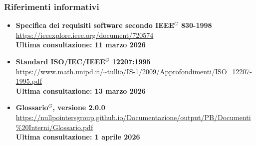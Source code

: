 	\subsubsection{Riferimenti informativi}
	\begin{itemize}[itemsep=5pt, parsep=5pt, label=$\scriptstyle\bullet$]

    \item \textbf{Specifica dei requisiti software secondo IEEE$^G$ 830-1998}\\
     \url{https://ieeexplore.ieee.org/document/720574}\\[3pt]
    \textbf{Ultima consultazione: 11 marzo 2026}

    \item \textbf{Standard ISO/IEC/IEEE$^G$ 12207:1995}\\
     \url{https://www.math.unipd.it/~tullio/IS-1/2009/Approfondimenti/ISO_12207-1995.pdf}\\[3pt]
    \textbf{Ultima consultazione: 13 marzo 2026}

	\item \textbf{Glossario$^G$, versione 2.0.0}\\
     \url{https://nullpointersgroup.github.io/Documentazione/output/PB/Documenti%20Interni/Glossario.pdf}\\[3pt]
    \textbf{Ultima consultazione: 1 aprile 2026}

	\end{itemize}